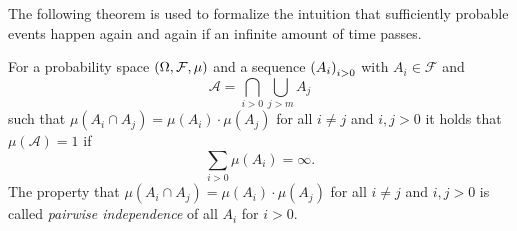 The following theorem is used to formalize the intuition that sufficiently
probable events happen again and again if an infinite amount of time passes.
\begin{theorem}
  \cite[Theorem 2.7]{Klenke}
  For a probability space $\left(\Omega, \mathcal{F}, \mu\right)$ and a sequence 
  $\left(A_{i}\right)_{i>0}$ with $A_{i}\in\mathcal{F}$ and
  \begin{equation*}
    \mathcal{A} = \bigcap_{i > 0}\bigcup_{j > m}A_{j}
  \end{equation*}
  such that $\mu(A_{i}\cap A_{j}) = \mu(A_{i})\cdot\mu(A_{j})$ for all 
  $i \neq j$ and $i,j > 0$ it holds that $\mu(\mathcal{A}) = 1$ if
  \begin{equation*}
    \sum\limits_{i>0}\mu(A_{i}) = \infty.
  \end{equation*}
  The property that $\mu(A_{i}\cap A_{j}) = \mu(A_{i})\cdot\mu(A_{j})$ for 
  all $i \neq j$ and $i,j > 0$ is called \emph{pairwise independence} of 
  all $A_{i}$ for $i > 0$.
  \label{thm:BorelCantelli}
\end{theorem}

